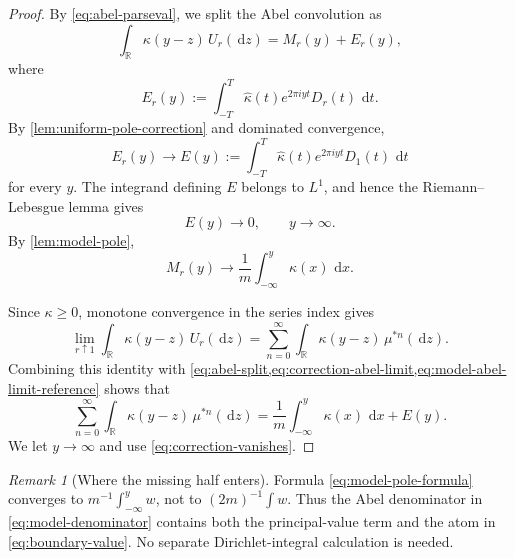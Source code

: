 \documentclass[10pt,reqno,a4paper]{amsart}
\numberwithin{equation}{section}
\theoremstyle{plain}
\theoremstyle{definition}
\theoremstyle{remark}
\newtheorem{remark}[theorem]{Remark}
\newcommand{\R}{\mathbb{R}}
\newcommand{\1}{\mathbf{1}}
\newcommand{\de}{\,\mathrm{d}}
\begin{document}
\begin{proof}
  By \cref{eq:abel-parseval}, we split the Abel convolution as
  \begin{equation}\label{eq:abel-split}
    \int_\R\kappa(y-z)\,U_r(\de z)
    =
    M_r(y)+E_r(y),
  \end{equation}
  where
  \begin{equation*}
    E_r(y):=
    \int_{-T}^{T}
    \widehat\kappa(t)e^{2\pi iyt}D_r(t)\,\de t.
  \end{equation*}
  By \cref{lem:uniform-pole-correction} and dominated convergence,
  \begin{equation}\label{eq:correction-abel-limit}
    E_r(y)\longrightarrow
    E(y)
    :=
    \int_{-T}^{T}
    \widehat\kappa(t)e^{2\pi iyt}D_1(t)\,\de t
  \end{equation}
  for every \(y\).  The integrand defining \(E\) belongs to \(L^1\), and hence
  the Riemann--Lebesgue lemma gives
  \begin{equation}\label{eq:correction-vanishes}
    E(y)\longrightarrow0,
    \qquad y\to\infty.
  \end{equation}
  By \cref{lem:model-pole},
  \begin{equation}\label{eq:model-abel-limit-reference}
    M_r(y)\longrightarrow
    \frac{1}{m}\int_{-\infty}^{y}\kappa(x)\,\de x.
  \end{equation}

  Since \(\kappa\geq0\), monotone convergence in the series index gives
  \begin{equation*}
    \lim_{r\uparrow1}
    \int_\R\kappa(y-z)\,U_r(\de z)
    =
    \sum_{n=0}^{\infty}
    \int_\R\kappa(y-z)\,\mu^{*n}(\de z).
  \end{equation*}
  Combining this identity with
  \cref{eq:abel-split,eq:correction-abel-limit,eq:model-abel-limit-reference}
  shows that
  \begin{equation}\label{eq:reference-representation}
    \sum_{n=0}^{\infty}
    \int_\R\kappa(y-z)\,\mu^{*n}(\de z)
    =
    \frac{1}{m}\int_{-\infty}^{y}\kappa(x)\,\de x+E(y).
  \end{equation}
  We let \(y\to\infty\) and use \cref{eq:correction-vanishes}.
\end{proof}

\begin{remark}[Where the missing half enters]\label{rem:missing-half}
  Formula \cref{eq:model-pole-formula} converges to
  \(m^{-1}\int_{-\infty}^y w\), not to
  \((2m)^{-1}\int w\).  Thus the Abel denominator in
  \cref{eq:model-denominator} contains both the principal-value term and the
  atom in \cref{eq:boundary-value}.  No separate Dirichlet-integral
  calculation is needed.
\end{remark}
\end{document}
